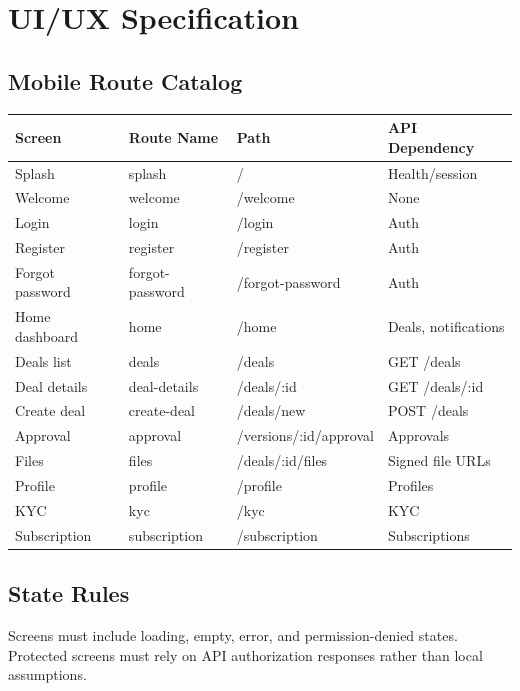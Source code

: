 \chapter{UI/UX Specification}
\section{Mobile Route Catalog}
\begin{longtable}{p{}p{}p{}p{}}
\toprule
Screen & Route Name & Path & API Dependency \\
\midrule
Splash & splash & / & Health/session \\
Welcome & welcome & /welcome & None \\
Login & login & /login & Auth \\
Register & register & /register & Auth \\
Forgot password & forgot-password & /forgot-password & Auth \\
Home dashboard & home & /home & Deals, notifications \\
Deals list & deals & /deals & GET /deals \\
Deal details & deal-details & /deals/:id & GET /deals/:id \\
Create deal & create-deal & /deals/new & POST /deals \\
Approval & approval & /versions/:id/approval & Approvals \\
Files & files & /deals/:id/files & Signed file URLs \\
Profile & profile & /profile & Profiles \\
KYC & kyc & /kyc & KYC \\
Subscription & subscription & /subscription & Subscriptions \\
\bottomrule
\end{longtable}
\section{State Rules}
Screens must include loading, empty, error, and permission-denied states. Protected screens must rely on API authorization responses rather than local assumptions.
